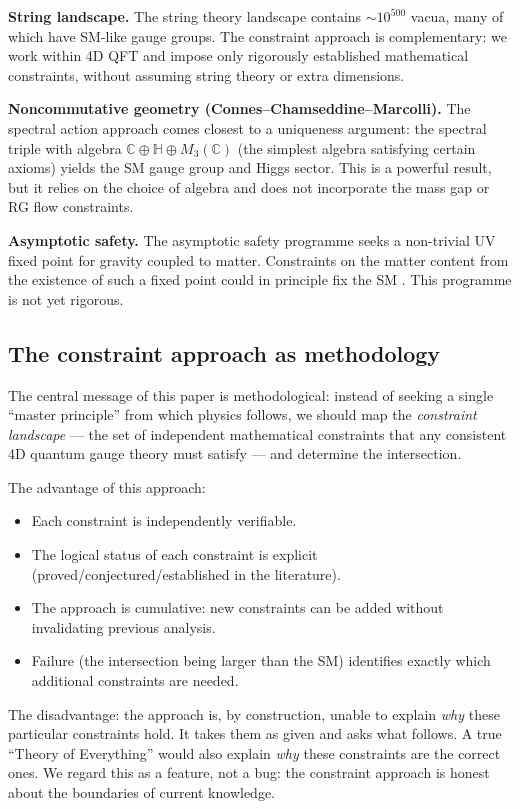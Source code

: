 \documentclass[12pt]{article}
\theoremstyle{definition}
\theoremstyle{remark}
\newcommand{\C}{\mathbb{C}}
\begin{document}
\textbf{String landscape.}
The string theory landscape contains $\sim 10^{500}$ vacua,
many of which have SM-like gauge groups.  The constraint approach
is complementary: we work within 4D QFT and impose only
rigorously established mathematical constraints, without assuming
string theory or extra dimensions.

\textbf{Noncommutative geometry (Connes--Chamseddine--Marcolli).}
The spectral action approach \cite{CCM2007} comes closest to a
uniqueness argument: the spectral triple with algebra
$\C \oplus \mathbb{H} \oplus M_3(\C)$ (the simplest algebra
satisfying certain axioms) yields the SM gauge group and Higgs
sector.  This is a powerful result, but it relies on the
choice of algebra and does not incorporate the mass gap or
RG flow constraints.

\textbf{Asymptotic safety.}
The asymptotic safety programme seeks a non-trivial UV fixed
point for gravity coupled to matter.  Constraints on the matter
content from the existence of such a fixed point could in
principle fix the SM \cite{Eichhorn2019}.  This programme is
not yet rigorous.

\subsection{The constraint approach as methodology}

The central message of this paper is methodological:
instead of seeking a single ``master principle'' from which
physics follows, we should map the \emph{constraint landscape}
--- the set of independent mathematical constraints that any
consistent 4D quantum gauge theory must satisfy --- and determine
the intersection.

The advantage of this approach:
\begin{itemize}
\item Each constraint is independently verifiable.
\item The logical status of each constraint is explicit
  (proved/conjectured/established in the literature).
\item The approach is cumulative: new constraints can be added
  without invalidating previous analysis.
\item Failure (the intersection being larger than the SM)
  identifies exactly which additional constraints are needed.
\end{itemize}

The disadvantage: the approach is, by construction, unable to
explain \emph{why} these particular constraints hold.  It takes
them as given and asks what follows.  A true ``Theory of
Everything'' would also explain \emph{why} these constraints are
the correct ones.  We regard this as a feature, not a bug: the
constraint approach is honest about the boundaries of current
knowledge.
\end{document}
